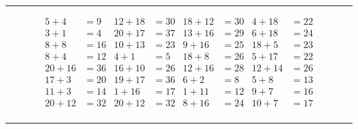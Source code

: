 \documentclass{article}
\begin{document}
\begin{sloppy}
\hrule
\begin{align*}
    {5} + {4} &= {9} & {12} + {18} &= {30} & {18} + {12} &= {30} & {4} + {18} &= {22} \\
    {3} + {1} &= {4} & {20} + {17} &= {37} & {13} + {16} &= {29} & {6} + {18} &= {24} \\
    {8} + {8} &= {16} & {10} + {13} &= {23} & {9} + {16} &= {25} & {18} + {5} &= {23} \\
    {8} + {4} &= {12} & {4} + {1} &= {5} & {18} + {8} &= {26} & {5} + {17} &= {22} \\
    {20} + {16} &= {36} & {16} + {10} &= {26} & {12} + {16} &= {28} & {12} + {14} &= {26} \\
    {17} + {3} &= {20} & {19} + {17} &= {36} & {6} + {2} &= {8} & {5} + {8} &= {13} \\
    {11} + {3} &= {14} & {1} + {16} &= {17} & {1} + {11} &= {12} & {9} + {7} &= {16} \\
    {20} + {12} &= {32} & {20} + {12} &= {32} & {8} + {16} &= {24} & {10} + {7} &= {17} \\
\end{align*}
\hrule
\end{sloppy}
\end{document}
